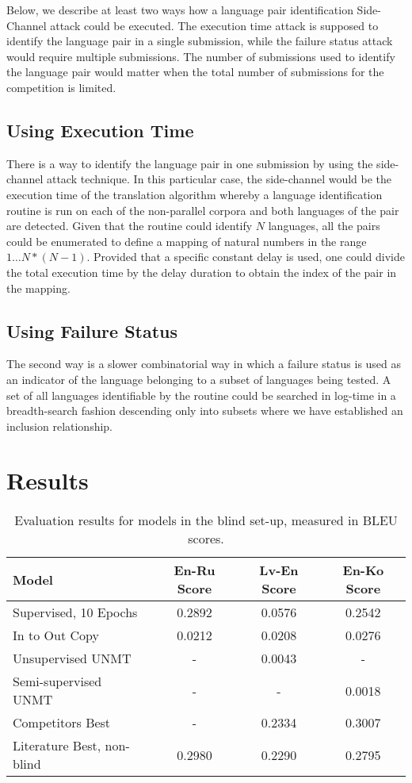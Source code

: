 \documentclass[]{article}
\begin{document}
Below, we describe at least two ways how a language pair identification Side-Channel attack could be executed.
The execution time attack is supposed to identify the language pair in a single submission, while the failure status attack would require multiple submissions.
The number of submissions used to identify the language pair would matter when the total number of submissions for the competition is limited.

\subsection{Using Execution Time}
\label{sect:execution_time_attack}

There is a way to identify the language pair in one submission by using the side-channel attack technique.
In this particular case, the side-channel would be the execution time of the translation algorithm whereby a language identification routine is run on each of the non-parallel corpora and both languages of the pair are detected.
Given that the routine could identify $N$ languages, all the pairs could be enumerated to define a mapping of natural numbers in the range $1\dots N*(N-1)$.
Provided that a specific constant delay is used, one could divide the total execution time by the delay duration to obtain the index of the pair in the mapping.

\subsection{Using Failure Status}
\label{sect:failure_status_attack}

The second way is a slower combinatorial way in which a failure status is used as an indicator of the language belonging to a subset of languages being tested.
A set of all languages identifiable by the routine could be searched in log-time in a breadth-search fashion descending only into subsets where we have established an inclusion relationship.

\section{Results}
\label{sect:results}

\begin{table}
\begin{center}
\begin{tabular}{ l c c c }
Model & En-Ru Score & Lv-En Score & En-Ko Score \\
\hline
Supervised, 10 Epochs & 0.2892 & 0.0576 & 0.2542 \\
In to Out Copy & 0.0212 & 0.0208 & 0.0276 \\
Unsupervised UNMT & - & 0.0043 & - \\
Semi-supervised UNMT & - & - & 0.0018 \\
Competitors Best & - & 0.2334 & 0.3007 \\
Literature Best, non-blind & 0.2980 & 0.2290 & 0.2795
\end{tabular}
\end{center}
\caption{Evaluation results for models in the blind set-up, measured in BLEU scores.}
\label{table:results}
\end{table}
\end{document}
